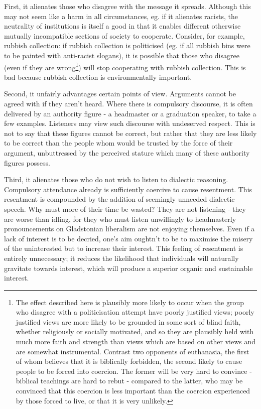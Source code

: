 \documentclass[10pt,a4paper]{article}
\begin{document}
\begin{multicols}{2}
	First, it alienates those who disagree with the message it spreads.
	Although this may not seem like a harm in all circumstances, eg. if it
	alienates racists, the neutrality of institutions is itself a good in
	that it enables different otherwise mutually incompatible sections of
	society to cooperate. Consider, for example, rubbish collection: if
	rubbish collection is politicised (eg. if all rubbish bins were to be
	painted with anti-racist slogans), it is possible that those who
	disagree (even if they are wrong\footnote{The effect described here is
		plausibly more likely to occur when the group who disagree with a
		politicisation attempt have poorly justified views; poorly justified
		views are more likely to be grounded in some sort of blind faith,
		whether religiously or socially motivated, and so they are plausibly
		held with much more faith and strength than views which are based on
		other views and are somewhat instrumental. Contrast two opponents of
		euthanasia, the first of whom believes that it is biblically
		forbidden, the second likely to cause people to be forced into
		coercion. The former will be very hard to convince - biblical
		teachings are hard to rebut - compared to the latter, who may be
		convinced that this coercion is less important than the coercion
		experienced by those forced to live, or that it is very unlikely.})
	will stop cooperating with rubbish collection. This is bad because
	rubbish collection is environmentally important.
	
	Second, it unfairly advantages certain points of view. Arguments cannot
	be agreed with if they aren't heard. Where there is compulsory
	discourse, it is often delivered by an authority figure - a headmaster
	or a graduation speaker, to take a few examples. Listeners may view such
	discourse with undeserved respect. This is not to say that these figures
	cannot be correct, but rather that they are less likely to be correct
	than the people whom would be trusted by the force of their argument,
	unbuttressed by the perceived stature which many of these authority
	figures possess.
	
	Third, it alienates those who do not wish to listen to dialectic
	reasoning. Compulsory attendance already is sufficiently coercive to
	cause resentment. This resentment is compounded by the addition of
	seemingly unneeded dialectic speech. Why must more of their time be
	wasted? They are not listening - they are worse than idling, for they
	who must listen unwillingly to headmasterly pronouncements on
	Gladstonian liberalism are not enjoying themselves. Even if a lack of
	interest is to be decried, one's aim oughtn't to be to maximise the
	misery of the uninterested but to increase their interest. This feeling
	of resentment is entirely unnecessary; it reduces the likelihood that
	individuals will naturally gravitate towards interest, which will
	produce a superior organic and sustainable interest.
	

\end{multicols}
\end{document}
